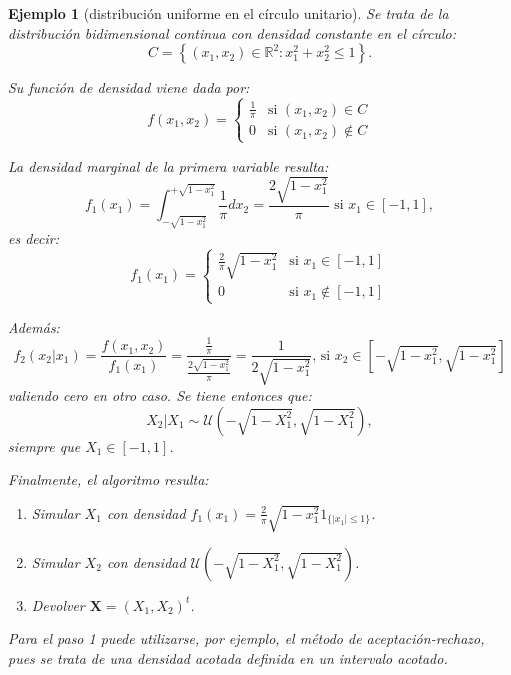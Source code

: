 \documentclass[
  10pt,
]{book}
\renewcommand{\mathbf}[1]{\symbf{#1}}
\theoremstyle{break}
\newtheorem{example}{Ejemplo}[chapter]
\theoremstyle{nonumberplain}
\begin{document}
\begin{example}[distribución uniforme en el círculo unitario]

Se trata de la distribución bidimensional continua con densidad
constante en el círculo:
\[C = \left\{ \left( x_1, x_2 \right)  \in \mathbb{R}^2 : x_1^2 + x_2^2 \leq 1 \right\}.\]

Su función de densidad viene dada por:
\[f\left( x_1,x_2\right) = \left\{
\begin{array}{ll}
\frac{1}{\pi} & \text{si } \left( x_1,x_2\right)  \in C\\
0 & \text{si } \left( x_1,x_2\right)  \notin C
\end{array}\right.\]

La densidad marginal de la primera variable resulta:
\[f_1\left( x_1\right) = \int_{-\sqrt{1-x_1^2}}^{+\sqrt{1-x_1^2}}\frac{1}{\pi}dx_2
= \frac{2\sqrt{1-x_1^2}}{\pi}
\text{ si }x_1\in\left[-1,1\right],\]
es decir:
\[f_1\left( x_1\right) = \left\{
\begin{array}{ll}
\frac{2}{\pi}\sqrt{1-x_1^2} & \text{si } x_1\in[-1, 1]  \\
0 & \text{si } x_1\notin\left[ -1,1\right]  
\end{array}\right.\]

Además:
\[f_2\left( x_2|x_1\right) = \frac{f\left( x_1,x_2\right)  }{f_1\left( x_1\right)} = \frac{\frac{1}{\pi}}{\frac{2\sqrt{1-x_1^2}}{\pi}}= \frac{1}{2\sqrt{1-x_1^2}}\text{, si }x_2\in\left[
-\sqrt{1-x_1^2},\sqrt{1-x_1^2}\right]\]
valiendo cero en otro caso.
Se tiene entonces que:
\[X_2|X_1 \sim \mathcal{U}\left(  -\sqrt{1-X_1^2},\sqrt{1-X_1^2}\right),\]
siempre que \(X_1\in[-1, 1]\).

Finalmente, el algoritmo resulta:

\begin{enumerate}
\def\labelenumi{\arabic{enumi}.}
\item
  Simular \(X_1\) con densidad \(f_1\left( x_1\right) = \frac{2}{\pi}\sqrt{1-x_1^2}1_{\{|x_1|\leq1\}}\).
\item
  Simular \(X_2\) con densidad \(\mathcal{U}\left( -\sqrt{1-X_1^2},\sqrt{1-X_1^2}\right)\).
\item
  Devolver \(\mathbf{X}= \left( X_1,X_2\right) ^t\).
\end{enumerate}

Para el paso 1 puede utilizarse, por ejemplo, el método de
aceptación-rechazo, pues se trata de una densidad acotada definida en un
intervalo acotado.
\end{example}
\end{document}
